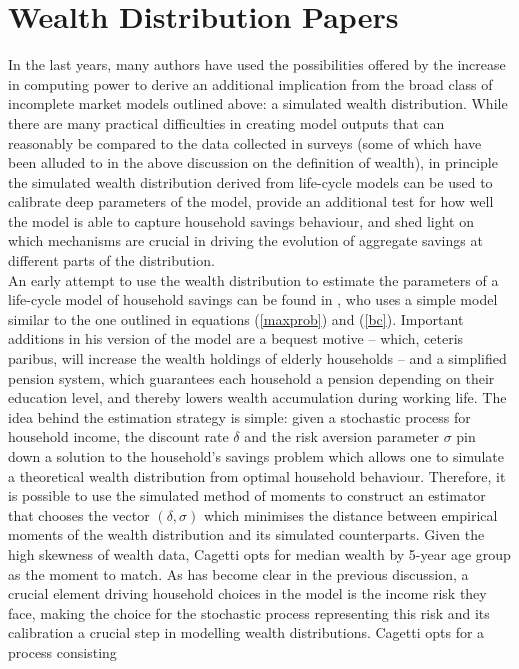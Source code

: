 \section{Wealth Distribution Papers}
In the last years, many authors have used the possibilities offered
by the increase in computing power to derive an additional implication from the
broad class of incomplete market models outlined above: a simulated wealth 
distribution. While there are many practical difficulties in creating model 
outputs that can reasonably be compared to the data collected in surveys (some of
which have been alluded to in the above discussion on the definition of wealth),
in principle the simulated wealth distribution derived from life-cycle models
can be used to calibrate deep parameters of the model, provide an additional
test for how well the model is able to capture household savings behaviour, 
and shed light on which mechanisms are crucial in driving the evolution of 
aggregate savings at different parts of the distribution. \\
An early attempt to use the wealth distribution to estimate the parameters of
a life-cycle model of household savings can be found in \citet{Cagetti2003},
who uses a simple model similar to the one outlined in equations (\ref{maxprob})
and (\ref{bc}). Important additions in his version of the model are a bequest 
motive -- which, ceteris paribus, will increase the wealth holdings of elderly
households -- and a simplified pension system, which guarantees each household
a pension depending on their education level, and thereby lowers wealth 
accumulation during working life. The idea behind the estimation strategy is 
simple: given a stochastic process for household income, the discount rate $\delta$
and the risk aversion parameter $\sigma$ pin down a solution to the household's savings problem 
which allows one to simulate a theoretical wealth distribution from optimal 
household behaviour. Therefore, it is possible to use the simulated method of
moments to construct an estimator that chooses the vector $(\delta,\sigma)$ 
which minimises the distance between empirical moments of the wealth
distribution and its simulated counterparts. Given the high skewness of wealth
data, Cagetti opts for median wealth by 5-year age group as the moment to match.
As has become clear in the previous discussion, a crucial element driving 
household choices in the model is the income risk they face, making the choice
for the stochastic process representing this risk and its calibration a crucial
step in modelling wealth distributions. Cagetti opts for a process consisting
